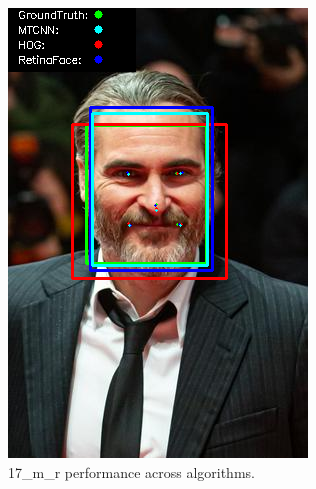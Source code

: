 \documentclass{l4proj}
\begin{document}
\begin{appendices}
\begin{figure}[h!]
\begin{minipage}{0.49\textwidth}
     \includegraphics[width=\textwidth]{images/appendix/17.png}
    \caption{17\_m\_r performance across algorithms.}
    \label{whoopi_result}
  \end{minipage}
\end{figure}


\end{appendices}
\end{document}
